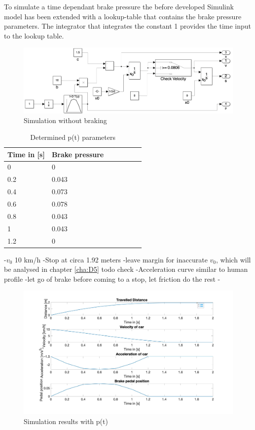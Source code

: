 To simulate a time dependant brake pressure the before developed Simulink model has been extended with a lookup-table that contains the brake pressure parameters. The integrator that integrates the constant 1 provides the time input to the lookup table.
\begin{figure}[H]
\centering
\includegraphics[width=1\textwidth]{images/D3_model_extension.png}
\caption{Simulation without braking}
\label{fig:D3_IndividualBraking2}
\end{figure}

\begin{table}[H]
\centering
\caption{Determined p(t) parameters}
\renewcommand{\arraystretch}{1}
\begin{tabular}{lllllll}
\textbf{Time in [s]} & \textbf{Brake pressure}\\\hline
0 & 0\\
0.2  & 0.043\\
0.4  & 0.073\\
0.6  & 0.078\\
0.8  & 0.043\\
1  & 0.043\\
1.2  & 0\\
\end{tabular}
\end{table}

-$v_0$ 10 km/h
-Stop at circa 1.92 meters
-leave margin for inaccurate $v_0$, which will be analysed in chapter \ref{cha:D5} todo check
-Acceleration curve similar to human profile
-let go of brake before coming to a stop, let friction do the rest
-
\begin{figure}[H]
\centering
\includegraphics[width=1\textwidth]{images/D3_pt.jpg}
\caption{Simulation results with p(t)}
\label{fig:D3_IndividualBraking2}
\end{figure}

